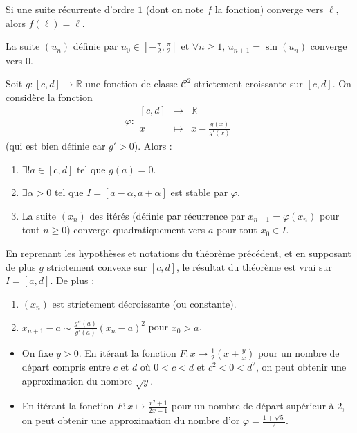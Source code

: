 	\begin{corollary}
		Si une suite récurrente d'ordre $1$ (dont on note $f$ la fonction) converge vers $\ell$, alors $f(\ell) = \ell$.
	\end{corollary}

	\begin{example}
		La suite $(u_n)$ définie par $u_0 \in \left[ -\frac{\pi}{2}, \frac{\pi}{2} \right]$ et $\forall n \geq 1, \, u_{n+1} = \sin(u_n)$ converge vers $0$.
	\end{example}


	\begin{application}
		Soit $g : [c, d] \rightarrow \mathbb{R}$ une fonction de classe $\mathcal{C}^2$ strictement croissante sur $[c, d]$. On considère la fonction
		\[ \varphi :
		\begin{array}{ccc}
			[c, d] &\rightarrow& \mathbb{R} \\
			x &\mapsto& x - \frac{g(x)}{g'(x)}
		\end{array}
		\]
		(qui est bien définie car $g' > 0$). Alors :
		\begin{enumerate}[label=(\roman*)]
			\item $\exists! a \in [c, d]$ tel que $g(a) = 0$.
			\item $\exists \alpha > 0$ tel que $I = [a - \alpha, a + \alpha]$ est stable par $\varphi$.
			\item La suite $(x_n)$ des itérés (définie par récurrence par $x_{n+1} = \varphi(x_n)$ pour tout $n \geq 0$) converge quadratiquement vers $a$ pour tout $x_0 \in I$.
		\end{enumerate}
	\end{application}

	\begin{corollary}
		En reprenant les hypothèses et notations du théorème précédent, et en supposant de plus $g$ strictement convexe sur $[c, d]$, le résultat du théorème est vrai sur $I = [a, d]$. De plus :
		\begin{enumerate}[label=(\roman*)]
			\item $(x_n)$ est strictement décroissante (ou constante).
			\item $x_{n+1} - a \sim \frac{g''(a)}{g'(a)} (x_n - a)^2$ pour $x_0 > a$.
		\end{enumerate}
	\end{corollary}

	\begin{example}
		\begin{itemize}
			\item On fixe $y > 0$. En itérant la fonction $F : x \mapsto \frac{1}{2} \left( x + \frac{y}{x} \right)$ pour un nombre de départ compris entre $c$ et $d$ où $0 < c < d$ et $c^2 < 0 < d^2$, on peut obtenir une approximation du nombre $\sqrt{y}$.
			\item En itérant la fonction $F : x \mapsto \frac{x^2+1}{2x-1}$ pour un nombre de départ supérieur à $2$, on peut obtenir une approximation du nombre d'or $\varphi = \frac{1+\sqrt{5}}{2}$.
		\end{itemize}
	\end{example}

